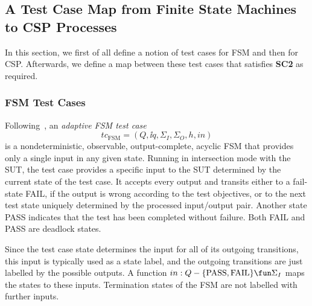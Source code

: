\subsection{A Test Case Map from Finite State Machines to CSP Processes}
\label{sec:tcmap}

In this section, we first of all define a notion of test cases for FSM and
then for CSP. Afterwards, we define a map between these test cases that satisfies
{\bf SC2} as required.

\subsubsection{FSM Test Cases}

Following~\cite{DBLP:conf/hase/PetrenkoY14},
an \emph{adaptive FSM test case}
\[
tc_\text{FSM}=(Q,\ii q,\Sigma_I,\Sigma_O,h,in)
\]
is a nondeterministic, observable, output-complete, acyclic FSM that provides
only a single input in any given state. Running in intersection mode with the
SUT, the test case provides a specific input to the SUT determined by the
current state of the test case. It accepts every output and transits either
to a fail-state FAIL, if the output is wrong according to the test
objectives, or to the next test state uniquely determined  by the processed
input/output pair. Another state PASS indicates that the test has been
completed without failure. Both FAIL and PASS are deadlock states.

Since the test case state determines the input for all of its outgoing transitions, this input is typically used as a state label, and the outgoing transitions are just labelled by the possible outputs. A function $in : Q -\{  \text{PASS}, \text{FAIL} \}
\fun\Sigma_I$ maps the states to these inputs. Termination states
of the FSM are not labelled with further inputs.

